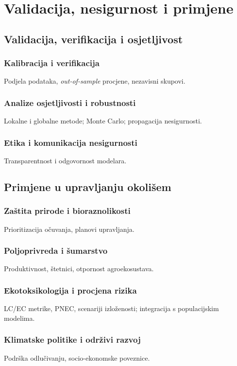 \documentclass[12pt,oneside]{book}
\begin{document}
	\part{Validacija, nesigurnost i primjene}
	
	\chapter{Validacija, verifikacija i osjetljivost}
	\section{Kalibracija i verifikacija}
	Podjela podataka, \emph{out-of-sample} procjene, nezavisni skupovi.
	\section{Analize osjetljivosti i robustnosti}
	Lokalne i globalne metode; Monte Carlo; propagacija nesigurnosti.
	\section{Etika i komunikacija nesigurnosti}
	Transparentnost i odgovornost modelara.
	
	\chapter{Primjene u upravljanju okolišem}
	\section{Zaštita prirode i bioraznolikosti}
	Prioritizacija očuvanja, planovi upravljanja.
	\section{Poljoprivreda i šumarstvo}
	Produktivnost, štetnici, otpornost agroekosustava.
	\section{Ekotoksikologija i procjena rizika}
	LC/EC metri\linebreak ke, PNEC, scenariji izloženosti; integracija s populacijskim modelima.
	\section{Klimatske politike i održivi razvoj}
	Podrška odlučivanju, socio-ekonomske poveznice.
	
\end{document}

